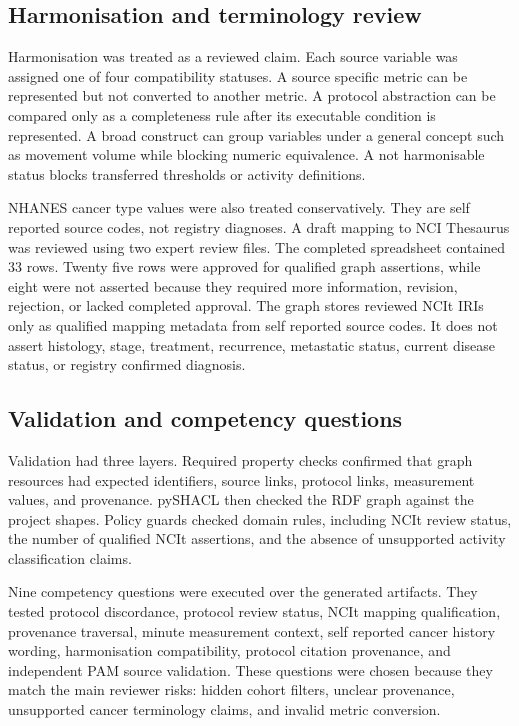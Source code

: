 \documentclass[final,5p,times,twocolumn]{elsarticle}
\begin{document}
\subsection{Harmonisation and terminology review}

Harmonisation was treated as a reviewed claim. Each source variable was assigned one of four compatibility statuses. A source specific metric can be represented but not converted to another metric. A protocol abstraction can be compared only as a completeness rule after its executable condition is represented. A broad construct can group variables under a general concept such as movement volume while blocking numeric equivalence. A not harmonisable status blocks transferred thresholds or activity definitions.

NHANES cancer type values were also treated conservatively. They are self reported source codes, not registry diagnoses. A draft mapping to NCI Thesaurus was reviewed using two expert review files. The completed spreadsheet contained 33 rows. Twenty five rows were approved for qualified graph assertions, while eight were not asserted because they required more information, revision, rejection, or lacked completed approval. The graph stores reviewed NCIt IRIs only as qualified mapping metadata from self reported source codes. It does not assert histology, stage, treatment, recurrence, metastatic status, current disease status, or registry confirmed diagnosis.

\subsection{Validation and competency questions}

Validation had three layers. Required property checks confirmed that graph resources had expected identifiers, source links, protocol links, measurement values, and provenance. pySHACL then checked the RDF graph against the project shapes. Policy guards checked domain rules, including NCIt review status, the number of qualified NCIt assertions, and the absence of unsupported activity classification claims.

Nine competency questions were executed over the generated artifacts. They tested protocol discordance, protocol review status, NCIt mapping qualification, provenance traversal, minute measurement context, self reported cancer history wording, harmonisation compatibility, protocol citation provenance, and independent PAM source validation. These questions were chosen because they match the main reviewer risks: hidden cohort filters, unclear provenance, unsupported cancer terminology claims, and invalid metric conversion.
\end{document}
